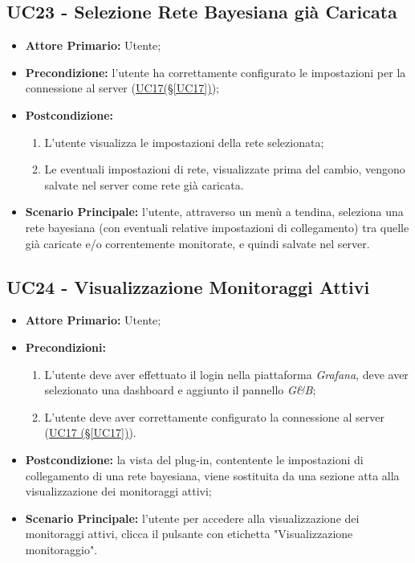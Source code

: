 \pagebreak

\subsection{UC23 - Selezione Rete Bayesiana già Caricata}\label{UC23}
\begin{itemize}
	\item \textbf{Attore Primario:}  Utente;
	\item \textbf{Precondizione:} l'utente ha correttamente configurato le impostazioni per la connessione al server (\hyperref[UC17]{UC17(§\ref*{UC17})});
	\item \textbf{Postcondizione:}
	\begin{enumerate}
		\item L'utente visualizza le impostazioni della rete selezionata;
		\item Le eventuali impostazioni di rete, visualizzate prima del cambio, vengono salvate nel server come rete già caricata.
	\end{enumerate}
	\item \textbf{Scenario Principale:} l'utente, attraverso un menù a tendina, seleziona una rete bayesiana (con eventuali relative impostazioni di collegamento) tra quelle già caricate e/o correntemente monitorate, e quindi salvate nel server.
\end{itemize}

\pagebreak

\subsection{UC24 - Visualizzazione Monitoraggi Attivi}\label{UC24}
\begin{itemize}
	\item \textbf{Attore Primario:}  Utente;
	\item \textbf{Precondizioni:} 
	\begin{enumerate}
		\item L'utente deve aver effettuato il login nella piattaforma \textit{Grafana}, deve aver selezionato una dashboard e aggiunto il pannello \textit{G\&B};
		\item L'utente deve aver correttamente configurato la connessione al server (\hyperref[UC17]{UC17 (§\ref*{UC17})}).
	\end{enumerate}
	\item \textbf{Postcondizione:} la vista del plug-in, contentente le impostazioni di collegamento di una rete bayesiana, viene sostituita da una sezione atta alla visualizzazione dei monitoraggi attivi;
	\item \textbf{Scenario Principale:} l'utente per accedere alla visualizzazione dei monitoraggi attivi, clicca il pulsante con etichetta "Visualizzazione monitoraggio".
\end{itemize}

